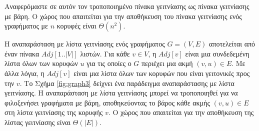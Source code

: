 \documentclass[12pt,a4paper]{article} %
\begin{document}
Αναφερόμαστε σε αυτόν τον τροποποιημένο πίνακα γειτνίασης ως πίνακα γειτνίασης με βάρη. Ο χώρος που απαιτείται για την αποθήκευση του πίνακα γειτνίασης ενός γραφήματος με $n$ κορυφές είναι $\Theta(n^2)$.

Η αναπαράσταση με λίστα γειτνίασης ενός γραφήματος $G = (V, E)$ αποτελείται από έναν πίνακα $Adj[1..|V|]$ λιστών. Για κάθε $v \in V$, η $Adj[v]$ είναι μια συνδεδεμένη λίστα όλων των κορυφών $u$ για τις οποίες ο $G$ περιέχει μια ακμή $(v, u) \in E$. Με άλλα λόγια, η $Adj[v]$ είναι μια λίστα όλων των κορυφών που είναι γειτονικές προς την $v$. Το Σχήμα \ref{fig:graph3} δείχνει ένα παράδειγμα αναπαράστασης με λίστα γειτνίασης. Η αναπαράσταση με λίστα γειτνίασης μπορεί να τροποποιηθεί για να φιλοξενήσει γραφήματα με βάρη,  αποθηκεύοντας το βάρος κάθε ακμής $(v, u) \in E$ στη λίστα γειτνίασης της κορυφής $v$. Ο χώρος που απαιτείται για την αποθήκευση της λίστας γειτνίασης είναι $\Theta(|E|)$.
\end{document}
